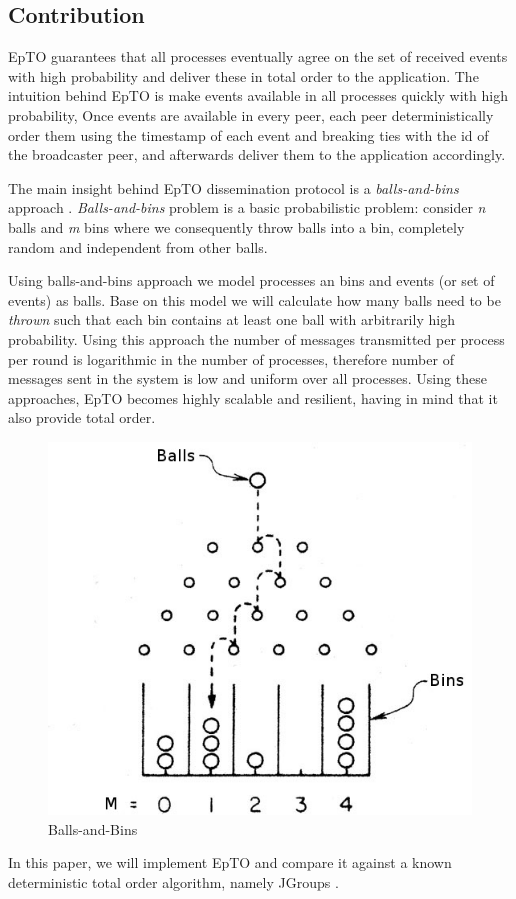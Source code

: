 \documentclass[10pt,conference,a4paper]{IEEEtran}
\begin{document}
\subsection{Contribution}
EpTO \autocite{matos2015epto} guarantees that all processes eventually agree on the set of received events with high probability and deliver these in total order to the application. The intuition behind EpTO is make events available in all processes quickly with high probability,
Once events are available in every peer, each peer deterministically order them using the timestamp of each event and breaking ties with the id of the broadcaster peer, and afterwards deliver them to the application accordingly.
\par
The main insight behind EpTO dissemination protocol is a \textit{balls-and-bins} approach \autocite{Koldehofe02simplegossiping}. \textit{Balls-and-bins} problem is a basic probabilistic problem: consider \textit{n} balls and \textit{m} bins where we consequently throw balls into a bin, completely random and independent from other balls.
\par
Using balls-and-bins approach we model processes an bins and events (or set of events) as balls. Base on this model we will calculate how many balls need to be \textit{thrown} such that each bin contains at least one ball with arbitrarily high probability. Using this approach the number of messages transmitted per process per round is logarithmic in the number of processes, therefore number of messages sent in the system is low and uniform over all processes. Using these approaches, EpTO becomes highly scalable and resilient, having in mind that it also provide total order.


\begin{figure}
\includegraphics[width=\linewidth]{figures/BnB.jpeg}
\caption{Balls-and-Bins}
\label{fig:balls-and-bins}
\end{figure}
\par
In this paper, we will implement EpTO and compare it against a known deterministic total order algorithm, namely JGroups \autocite{jgroups}.
\end{document}
